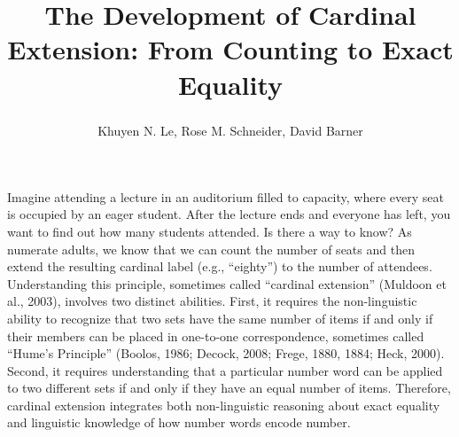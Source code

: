 \documentclass[
  man,floatsintext]{apa7}
\title{The Development of Cardinal Extension: From Counting to Exact Equality}
\author{Khuyen N. Le\textsuperscript{}, Rose M. Schneider\textsuperscript{}, David Barner\textsuperscript{}}
\date{}
\affiliation{\vspace{0.5cm}\textsuperscript{} {Department of Psychology, University of California, San Diego}}
\begin{document}
\maketitle

Imagine attending a lecture in an auditorium filled to capacity, where every seat is occupied by an eager student. After the lecture ends and everyone has left, you want to find out how many students attended. Is there a way to know? As numerate adults, we know that we can count the number of seats and then extend the resulting cardinal label (e.g., ``eighty'') to the number of attendees. Understanding this principle, sometimes called ``cardinal extension'' (Muldoon et al., 2003), involves two distinct abilities. First, it requires the non-linguistic ability to recognize that two sets have the same number of items if and only if their members can be placed in one-to-one correspondence, sometimes called ``Hume's Principle'' (Boolos, 1986; Decock, 2008; Frege, 1880, 1884; Heck, 2000). Second, it requires understanding that a particular number word can be applied to two different sets if and only if they have an equal number of items. Therefore, cardinal extension integrates both non-linguistic reasoning about exact equality and linguistic knowledge of how number words encode number.
\end{document}
